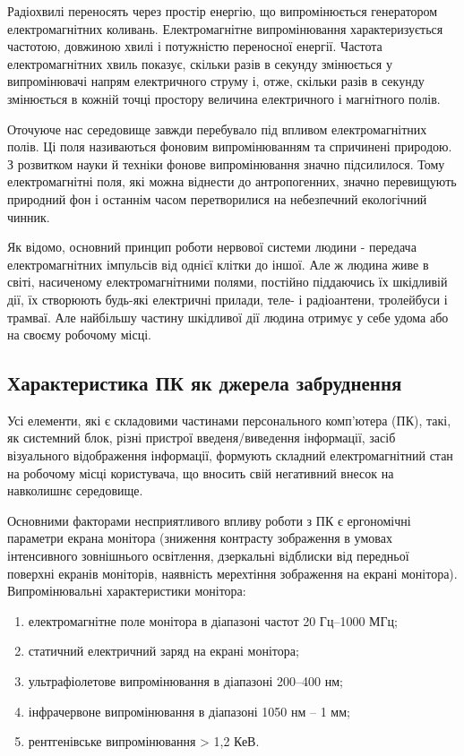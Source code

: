 Радіохвилі переносять через простір енергію, що випромінюється генератором електромагнітних коливань. Електромагнітне випромінювання характеризується частотою, довжиною хвилі і потужністю переносної енергії. Частота електромагнітних хвиль показує, скільки разів в секунду змінюється у випромінювачі напрям електричного струму і, отже, скільки разів в секунду змінюється в кожній точці простору величина електричного і магнітного полів.

Оточуюче нас середовище завжди перебувало під впливом електромагнітних полів. Ці поля називаються фоновим випромінюванням та спричинені природою. З розвитком науки й техніки фонове випромінювання значно підсилилося. Тому електромагнітні поля, які можна віднести до антропогенних, значно перевищують природний фон і останнім часом перетворилися на небезпечний екологічний чинник.

Як відомо, основний принцип роботи нервової системи людини - передача електромагнітних імпульсів від однієї клітки до іншої. Але ж людина живе в світі, насиченому електромагнітними полями, постійно піддаючись їх шкідливій дії, їх створюють будь-які електричні прилади, теле- і радіоантени, тролейбуси і трамваї. Але найбільшу частину шкідливої дії людина отримує у себе удома або на своєму робочому місці.

\subsection{Характеристика ПК як джерела забруднення}

Усі елементи, які є складовими частинами персонального комп’ютера (ПК), такі, як системний блок, різні пристрої введеня/виведення інформації, засіб візуального відображення інформації, формують складний електромагнітний стан на робочому місці користувача, що вносить свій негативний внесок на навколишнє середовище.

Основними факторами  несприятливого  впливу  роботи  з  ПК є ергономічні параметри екрана монітора (зниження   контрасту   зображення   в   умовах   інтенсивного   зовнішнього освітлення, дзеркальні відблиски від передньої поверхні екранів моніторів, наявність мерехтіння зображення на екрані монітора). Випромінювальні характеристики монітора:

\begin{enumerate}
\item електромагнітне поле монітора в діапазоні частот 20 Гц--1000 МГц;
\item статичний електричний заряд на екрані монітора;
\item ультрафіолетове випромінювання в діапазоні 200--400 нм;
\item інфрачервоне випромінювання в діапазоні 1050 нм -- 1 мм;
\item рентгенівське випромінювання > 1,2 КеВ.
\end{enumerate}


